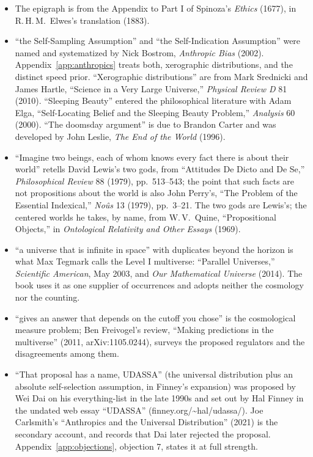 \begin{itemize}
\setlength{\itemsep}{0.5em}
\item The epigraph is from the Appendix to Part I of Spinoza's \textit{Ethics} (1677), in R.\,H.\,M.\ Elwes's translation (1883).
\item ``the Self-Sampling Assumption'' and ``the Self-Indication Assumption'' were named and systematized by Nick Bostrom, \textit{Anthropic Bias} (2002). Appendix~\ref{app:anthropics} treats both, xerographic distributions, and the distinct speed prior. ``Xerographic distributions'' are from Mark Srednicki and James Hartle, ``Science in a Very Large Universe,'' \textit{Physical Review D} 81 (2010). ``Sleeping Beauty'' entered the philosophical literature with Adam Elga, ``Self-Locating Belief and the Sleeping Beauty Problem,'' \textit{Analysis} 60 (2000). ``The doomsday argument'' is due to Brandon Carter and was developed by John Leslie, \textit{The End of the World} (1996).
\item ``Imagine two beings, each of whom knows every fact there is about their world'' retells David Lewis's two gods, from ``Attitudes De Dicto and De Se,'' \textit{Philosophical Review} 88 (1979), pp.~513--543; the point that such facts are not propositions about the world is also John Perry's, ``The Problem of the Essential Indexical,'' \textit{No\^us} 13 (1979), pp.~3--21. The two gods are Lewis's; the centered worlds he takes, by name, from W.\,V.\ Quine, ``Propositional Objects,'' in \textit{Ontological Relativity and Other Essays} (1969).
\item ``a universe that is infinite in space'' with duplicates beyond the horizon is what Max Tegmark calls the Level I multiverse: ``Parallel Universes,'' \textit{Scientific American}, May 2003, and \textit{Our Mathematical Universe} (2014). The book uses it as one supplier of occurrences and adopts neither the cosmology nor the counting.
\item ``gives an answer that depends on the cutoff you chose'' is the cosmological measure problem; Ben Freivogel's review, ``Making predictions in the multiverse'' (2011, arXiv:1105.0244), surveys the proposed regulators and the disagreements among them.
\item ``That proposal has a name, UDASSA'' (the universal distribution plus an absolute self-selection assumption, in Finney's expansion) was proposed by Wei Dai on his everything-list in the late 1990s and set out by Hal Finney in the undated web essay ``UDASSA'' (finney.org/\textasciitilde hal/udassa/). Joe Carlsmith's ``Anthropics and the Universal Distribution'' (2021) is the secondary account, and records that Dai later rejected the proposal. Appendix~\ref{app:objections}, objection 7, states it at full strength.

\end{itemize}

